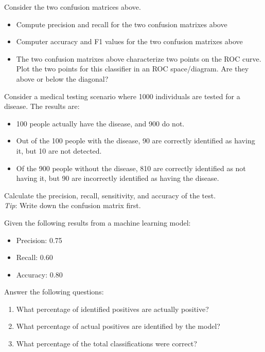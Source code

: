 \begin{exerciseboxpaper}
Consider the two confusion matrices above. 
  \begin{itemize}
     \item Compute precision and recall for the two confusion matrixes above
     \item Computer accuracy and F1 values for the two confusion matrixes above
     \item The two confusion matrixes above characterize two points on the ROC curve. Plot the two points for this classifier in an ROC space/diagram. Are they above or below the diagonal?
  \end{itemize}
\end{exerciseboxpaper}

\begin{exerciseboxpaper}
Consider a medical testing scenario where 1000 individuals are tested for a disease. The results are:
  \begin{itemize}
    \item 100 people actually have the disease, and 900 do not.
    \item Out of the 100 people with the disease, 90 are correctly identified as having it, but 10 are not detected.
    \item Of the 900 people without the disease, 810 are correctly identified as not having it, but 90 are incorrectly identified as having the disease.
  \end{itemize}
  Calculate the precision, recall, sensitivity, and accuracy of the test. \\
  \emph{Tip}: Write down the confusion matrix first.
\end{exerciseboxpaper}

\begin{exerciseboxpaper}
Given the following results from a machine learning model:
  \begin{itemize}
    \item Precision: 0.75
    \item Recall: 0.60
    \item Accuracy: 0.80
  \end{itemize}
Answer the following questions:
  \begin{enumerate}
    \item What percentage of identified positives are actually positive?
    \item What percentage of actual positives are identified by the model?
    \item What percentage of the total classifications were correct?
  \end{enumerate}
\end{exerciseboxpaper}

